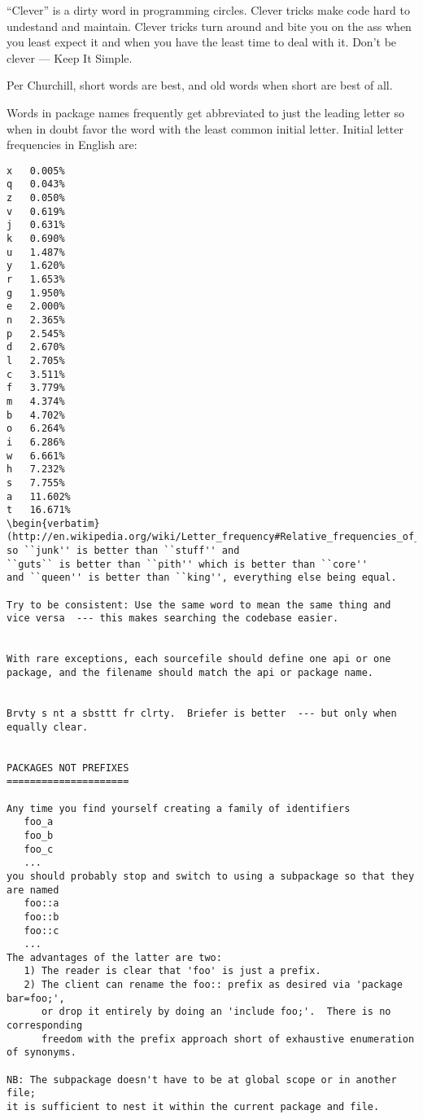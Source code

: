 ``Clever'' is a dirty word in programming circles.  Clever tricks 
make code hard to undestand and maintain.  Clever tricks turn around 
and bite you on the ass when you least expect it and when you have the 
least time to deal with it.  Don't be clever  --- Keep It Simple.


Per Churchill, short words are best, and old words when short are best of all.

Words in package names frequently get abbreviated to just the leading letter so 
when in doubt favor the word with the least common initial letter.  Initial letter frequencies in English 
are:
\begin{verbatim}
x	0.005%
q	0.043%
z	0.050%
v	0.619%
j	0.631%
k	0.690%
u	1.487%
y	1.620%
r	1.653%
g	1.950%
e	2.000%
n	2.365%
p	2.545%
d	2.670%
l	2.705%
c	3.511%
f	3.779%
m	4.374%
b	4.702%
o	6.264%
i	6.286%
w	6.661%
h	7.232%
s	7.755%
a	11.602%
t	16.671%
\begin{verbatim}
(http://en.wikipedia.org/wiki/Letter_frequency#Relative_frequencies_of_the_first_letters_of_a_word_in_the_English_language)
so ``junk'' is better than ``stuff'' and
``guts`` is better than ``pith'' which is better than ``core''
and ``queen'' is better than ``king'', everything else being equal.

Try to be consistent: Use the same word to mean the same thing and 
vice versa  --- this makes searching the codebase easier.


With rare exceptions, each sourcefile should define one api or one package, and the filename should match the api or package name.


Brvty s nt a sbsttt fr clrty.  Briefer is better  --- but only when equally clear.


PACKAGES NOT PREFIXES
=====================

Any time you find yourself creating a family of identifiers 
   foo_a
   foo_b
   foo_c
   ...
you should probably stop and switch to using a subpackage so that they are named 
   foo::a
   foo::b
   foo::c
   ...
The advantages of the latter are two:
   1) The reader is clear that 'foo' is just a prefix.
   2) The client can rename the foo:: prefix as desired via 'package bar=foo;',
      or drop it entirely by doing an 'include foo;'.  There is no corresponding 
      freedom with the prefix approach short of exhaustive enumeration of synonyms.

NB: The subpackage doesn't have to be at global scope or in another file;
it is sufficient to nest it within the current package and file.


\end{verbatim}
